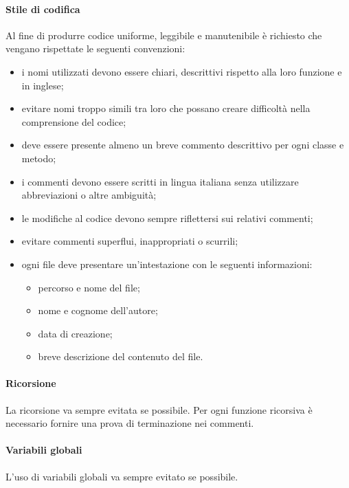                 \paragraph{Stile di codifica}
                Al fine di produrre codice uniforme, leggibile e manutenibile è richiesto che vengano rispettate le seguenti convenzioni:
                \begin{itemize}
                    \item i nomi utilizzati devono essere chiari, descrittivi rispetto alla loro funzione e in inglese;
                    \item evitare nomi troppo simili tra loro che possano creare difficoltà nella comprensione del codice;
                    \item deve essere presente almeno un breve commento descrittivo per ogni classe e metodo;
                    \item i commenti devono essere scritti in lingua italiana senza utilizzare abbreviazioni o altre ambiguità;
                    \item le modifiche al codice devono sempre riflettersi sui relativi commenti;
                    \item evitare commenti superflui, inappropriati o scurrili;
                    \item ogni file deve presentare un'intestazione con le seguenti informazioni:
                        \begin{itemize}
                            \item percorso e nome del file;
                            \item nome e cognome dell'autore;
                            \item data di creazione;
                            \item breve descrizione del contenuto del file.
                        \end{itemize}
                \end{itemize}
                \paragraph{Ricorsione}
                La ricorsione va sempre evitata se possibile. Per ogni funzione ricorsiva è necessario fornire una prova di terminazione nei commenti.
                \paragraph{Variabili globali}
                L'uso di variabili globali va sempre evitato se possibile.

